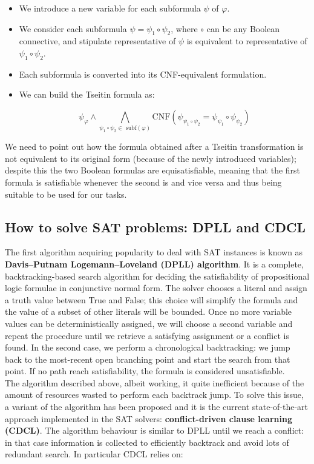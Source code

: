 \begin{itemize}
    \item We introduce a new variable for each subformula $\psi$ of $\varphi$.
    \item We consider each subformula $\psi = \psi_1 \circ \psi_2$, where $\circ$ can be any Boolean connective, and stipulate representative of $\psi$ is equivalent to representative of $\psi_1 \circ \psi_2$.
    \item Each subformula is converted into its CNF-equivalent formulation.
    \item We can build the Tseitin formula as:
    
    \begin{equation}
        \psi_\varphi \wedge \bigwedge_{\psi_1 \circ \psi_2 \in \textrm{  subf}(\varphi)} \textrm{CNF}(\psi_{\psi_1 \circ \psi_2} = \psi_{\psi_1} \circ \psi_{\psi_2})
    \end{equation}
\end{itemize}

We need to point out how the formula obtained after a Tseitin transformation is not equivalent to its original form (because of the newly introduced variables); despite this the two Boolean formulas are equisatisfiable, meaning that the first formula is satisfiable whenever the second is and vice versa and thus being suitable to be used for our tasks.


\subsection{How to solve SAT problems: DPLL and CDCL}

The first algorithm acquiring popularity to deal with SAT instances is known as \textbf{Davis–Putnam Logemann–Loveland (DPLL) algorithm}. It is a complete, backtracking-based search algorithm for deciding the satisfiability of propositional logic formulae in conjunctive normal form. The solver chooses a literal and assign a truth value between True and False; this choice will simplify the formula and the value of a subset of other literals will be bounded. Once no more variable values can be deterministically assigned, we will choose a second variable and repeat the procedure until we retrieve a satisfying assignment or a conflict is found. In the second case, we perform a chronological backtracking: we jump back to the most-recent open branching point and start the search from that point. If no path reach satisfiability, the formula is considered unsatisfiable. \\
The algorithm described above, albeit working, it quite inefficient because of the amount of resources wasted to perform each backtrack jump. To solve this issue, a variant of the algorithm has been proposed and it is the current state-of-the-art approach implemented in the SAT solvers: \textbf{conflict-driven clause learning (CDCL)}. The algorithm behaviour is similar to DPLL until we reach a conflict: in that case information is collected to efficiently backtrack and avoid lots of redundant search. In particular CDCL relies on:

